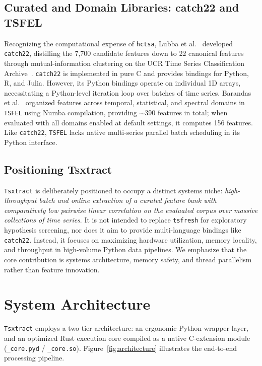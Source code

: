 \documentclass[conference]{IEEEtran}
\newcommand{\tsxtract}{\texttt{Tsxtract}}
\newcommand{\tsfresh}{\texttt{tsfresh}}
\newcommand{\catchtwentytwo}{\texttt{catch22}}
\newcommand{\tsfel}{\texttt{TSFEL}}
\newcommand{\hctsa}{\texttt{hctsa}}
\newcommand{\ucrarchive}{UCR Time Series Classification Archive}
\begin{document}
\subsection{Curated and Domain Libraries: catch22 and TSFEL}
Recognizing the computational expense of \hctsa{}, Lubba et al.~\cite{lubba2019catch22} developed \catchtwentytwo{}, distilling the 7,700 candidate features down to 22 canonical features through mutual-information clustering on the \ucrarchive{}~\cite{dau2019ucr}. \catchtwentytwo{} is implemented in pure C and provides bindings for Python, R, and Julia. However, its Python bindings operate on individual 1D arrays, necessitating a Python-level iteration loop over batches of time series. Barandas et al.~\cite{barandas2020tsfel} organized features across temporal, statistical, and spectral domains in \tsfel{} using Numba compilation, providing $\sim$390 features in total; when evaluated with all domains enabled at default settings, it computes 156 features. Like \catchtwentytwo{}, \tsfel{} lacks native multi-series parallel batch scheduling in its Python interface.

\subsection{Positioning Tsxtract}
\tsxtract{} is deliberately positioned to occupy a distinct systems niche: \textit{high-throughput batch and online extraction of a curated feature bank with comparatively low pairwise linear correlation on the evaluated corpus over massive collections of time series}. It is not intended to replace \tsfresh{} for exploratory hypothesis screening, nor does it aim to provide multi-language bindings like \catchtwentytwo{}. Instead, it focuses on maximizing hardware utilization, memory locality, and throughput in high-volume Python data pipelines. We emphasize that the core contribution is systems architecture, memory safety, and thread parallelism rather than feature innovation.

\section{System Architecture}
\label{sec:architecture}
\tsxtract{} employs a two-tier architecture: an ergonomic Python wrapper layer, and an optimized Rust execution core compiled as a native C-extension module (\texttt{\_core.pyd} / \texttt{\_core.so}). Figure~\ref{fig:architecture} illustrates the end-to-end processing pipeline.
\end{document}
